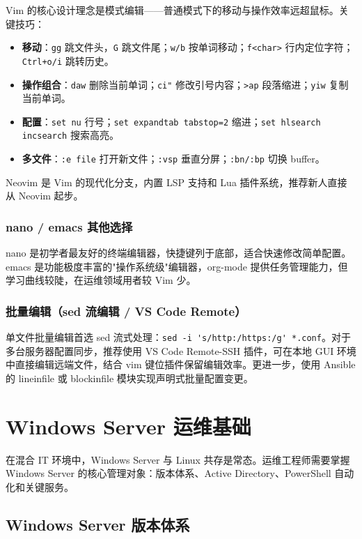 \documentclass[12pt,UTF8]{ctexbook}
\begin{document}
Vim 的核心设计理念是模式编辑——普通模式下的移动与操作效率远超鼠标。关键技巧：
\begin{itemize}
	\item \textbf{移动}：\verb|gg| 跳文件头，\verb|G| 跳文件尾；\verb|w/b| 按单词移动；\verb|f<char>| 行内定位字符；\verb|Ctrl+o/i| 跳转历史。
	\item \textbf{操作组合}：\verb|daw| 删除当前单词；\verb|ci"| 修改引号内容；\verb|>ap| 段落缩进；\verb|yiw| 复制当前单词。
	\item \textbf{配置}：\verb|set nu| 行号；\verb|set expandtab tabstop=2| 缩进；\verb|set hlsearch incsearch| 搜索高亮。
	\item \textbf{多文件}：\verb|:e file| 打开新文件；\verb|:vsp| 垂直分屏；\verb|:bn/:bp| 切换 buffer。
\end{itemize}

Neovim 是 Vim 的现代化分支，内置 LSP 支持和 Lua 插件系统，推荐新人直接从 Neovim 起步。

    \subsection{nano / emacs 其他选择}

nano 是初学者最友好的终端编辑器，快捷键列于底部，适合快速修改简单配置。emacs 是功能极度丰富的"操作系统级"编辑器，org-mode 提供任务管理能力，但学习曲线较陡，在运维领域用者较 Vim 少。

    \subsection{批量编辑（sed 流编辑 / VS Code Remote）}

单文件批量编辑首选 sed 流式处理：\verb|sed -i 's/http:/https:/g' *.conf|。对于多台服务器配置同步，推荐使用 VS Code Remote-SSH 插件，可在本地 GUI 环境中直接编辑远端文件，结合 vim 键位插件保留编辑效率。更进一步，使用 Ansible 的 lineinfile 或 blockinfile 模块实现声明式批量配置变更。



\chapter{Windows Server 运维基础}
\label{chap:windows-server}

在混合 IT 环境中，Windows Server 与 Linux 共存是常态。运维工程师需要掌握 Windows Server 的核心管理对象：版本体系、Active Directory、PowerShell 自动化和关键服务。

  \section{Windows Server 版本体系}
\end{document}
